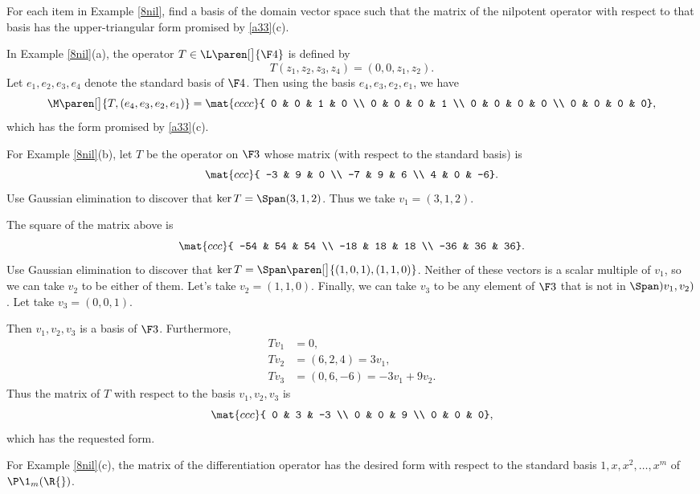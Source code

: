 \exercise
For each item in Example \ref{8nil}, find a basis of the domain vector space such that the matrix of the nilpotent operator with respect to that basis has the upper-triangular form promised by \ref{a33}(c).

\begin{Solution}
\begin{subtheorem}
\item
In Example \ref{8nil}(a), the operator $T \in \L\paren[\big]{\F4}$ is defined by
\[
T(z_1, z_2, z_3, z_4) = (0, 0, z_1, z_2).
\]
Let $e_1, e_2, e_3, e_4$ denote the standard basis of $\F4$. Then using the basis $e_4, e_3, e_2, e_1$, we have
\[
\M\paren[\big]{ T, (e_4, e_3, e_2, e_1) } = \mat{cccc}{
0 & 0 & 1 & 0 \\
0 & 0 & 0 & 1 \\
0 & 0 & 0 & 0 \\
0 & 0 & 0 & 0},
\]
which has the form promised by \ref{a33}(c).

\item
For Example \ref{8nil}(b), let $T$ be the operator on $\F3$ whose matrix (with respect to the standard basis) is
\[
\mat{ccc}{
-3 & 9 & 0 \\
-7 & 9 & 6 \\
4 & 0 & -6}.
\]
Use Gaussian elimination to discover that $\ker T = \Span(3,1,2)$. Thus we take $v_1 = (3,1,2)$.

The square of the matrix above is
\[
\mat{ccc}{
-54 & 54 & 54 \\
-18 & 18 & 18 \\
-36 & 36 & 36}.
\]
Use Gaussian elimination to discover that $\ker T = \Span\paren[\big]{ (1,0,1), (1,1,0) }$. Neither of these vectors is a scalar multiple of $v_1$, so we can take $v_2$ to be either of them. Let's take $v_2 = (1, 1, 0)$. Finally, we can take $v_3$ to be any element of $\F3$ that is not in $\Span)v_1, v_2)$. Let take $v_3 = (0, 0, 1)$.

Then $v_1, v_2, v_3$ is a basis of $\F3$. Furthermore,
\begin{align*}
Tv_1 &= 0, \\
Tv_2 &= (6, 2, 4) = 3v_1, \\
T v_3 &= (0, 6, -6) = -3 v_1 + 9v_2.
\end{align*}
Thus the matrix of $T$ with respect to the basis $v_1, v_2, v_3$ is
\[
\mat{ccc}{
0 & 3 & -3 \\
0 & 0 & 9 \\
0 & 0 & 0},
\]
which has the requested form.

\item
For Example \ref{8nil}(c), the matrix of the differentiation operator has the desired form with respect to the standard basis
$1, x, x^2, \ldots, x^m$ of $\P\1_m(\R{})$.
\end{subtheorem}
\end{Solution}

